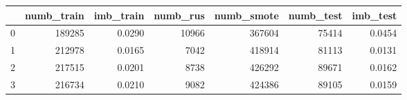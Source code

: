 \begin{tabular}{lrrrrrr}
\toprule
{} &  numb\_train &  imb\_train &  numb\_rus &  numb\_smote &  numb\_test &  imb\_test \\
\midrule
0 &      189285 &     0.0290 &     10966 &      367604 &      75414 &    0.0454 \\
1 &      212978 &     0.0165 &      7042 &      418914 &      81113 &    0.0131 \\
2 &      217515 &     0.0201 &      8738 &      426292 &      89671 &    0.0162 \\
3 &      216734 &     0.0210 &      9082 &      424386 &      89105 &    0.0159 \\
\bottomrule
\end{tabular}
